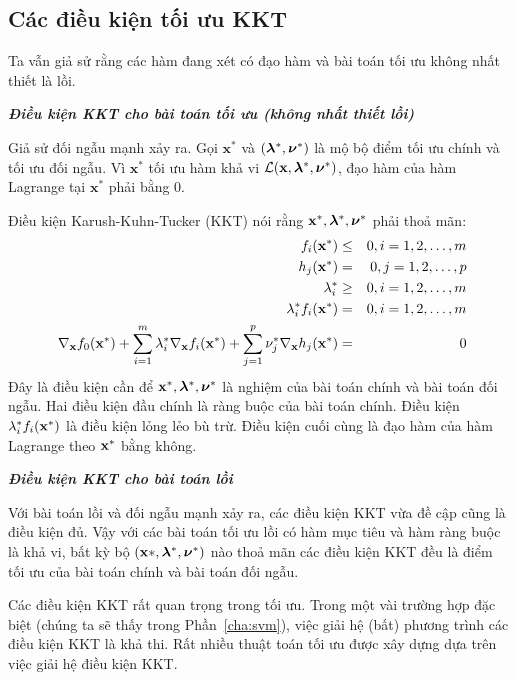 \subsection{Các điều kiện tối ưu KKT}
\label{ssec:kkt}
Ta vẫn giả sử rằng các hàm đang xét có đạo hàm và bài toán tối ưu không nhất
thiết là lồi.


\textit{\textbf{Điều kiện KKT cho bài toán tối ưu (không nhất thiết lồi)}}

Giả sử đối ngẫu mạnh xảy ra. Gọi $\mathbf{x}^*$ và $(\boldsymbol{\lambda}^*, \boldsymbol{\nu}^*)$ là mộ bộ điểm tối ưu chính và tối ưu đối ngẫu. Vì $\mathbf{x}^*$ tối ưu hàm khả vi $\mathcal{L}(\mathbf{x}, \boldsymbol{\lambda}^*, \boldsymbol{\nu}^*)$, đạo hàm của hàm Lagrange tại $\mathbf{x}^*$ phải bằng 0.

Điều kiện Karush-Kuhn-Tucker (KKT) nói rằng $\mathbf{x}^*, \boldsymbol{\lambda}^*, \boldsymbol{\nu}^*$
phải thoả mãn:
\begin{eqnarray}
f_i(\mathbf{x}^*) &\leq& 0, i = 1, 2, \dots, m \\\
h_j(\mathbf{x}^*) &=& 0, j = 1, 2, \dots, p \\\
\lambda_i^* &\geq& 0, i = 1, 2, \dots, m \\\
\lambda_i^*f_i(\mathbf{x}^*) &=& 0, i = 1, 2, \dots, m \\\
\nabla_{\mathbf{x}} f_0(\mathbf{x}^*) + \sum_{i=1}^m \lambda_i^* \nabla_{\mathbf{x}} f_i(\mathbf{x}^*) + \sum_{j=1}^p\nu_j^* \nabla_{\mathbf{x}} h_j(\mathbf{x}^*) &=& 0
\end{eqnarray}
Đây là {điều kiện cần} để $\mathbf{x}^*, \boldsymbol{\lambda}^*, \boldsymbol{\nu}^*$ là nghiệm
của bài toán chính và bài toán đối ngẫu. Hai điều kiện đầu chính là ràng buộc của bài toán chính. Điều kiện $\lambda_i^*f_i(\mathbf{x}^*)$ là điều kiện lỏng lẻo bù trừ. Điều kiện cuối cùng là đạo hàm của hàm Lagrange theo $\mathbf{x}^*$ bằng không.


\textit{\textbf{Điều kiện KKT cho bài toán lồi}}

Với bài toán lồi và đối ngẫu mạnh xảy ra, các điều kiện KKT vừa đề cập cũng là điều kiện đủ. Vậy với các bài toán tối ưu lồi có hàm mục tiêu và
hàm ràng buộc là khả vi, bất kỳ bộ $(\mathbf{x}*, \boldsymbol{\lambda}^*, \boldsymbol{\nu}^*)$ nào thoả mãn các
điều kiện KKT đều là điểm tối ưu của bài toán chính và bài toán đối ngẫu.


Các điều kiện KKT rất quan trọng trong tối ưu. Trong một vài trường hợp đặc biệt
(chúng ta sẽ thấy trong Phần~\ref{cha:svm}), việc giải hệ (bất) phương
trình các điều kiện KKT là khả thi. Rất nhiều thuật toán tối ưu được xây
dựng dựa trên việc giải hệ điều kiện KKT.

